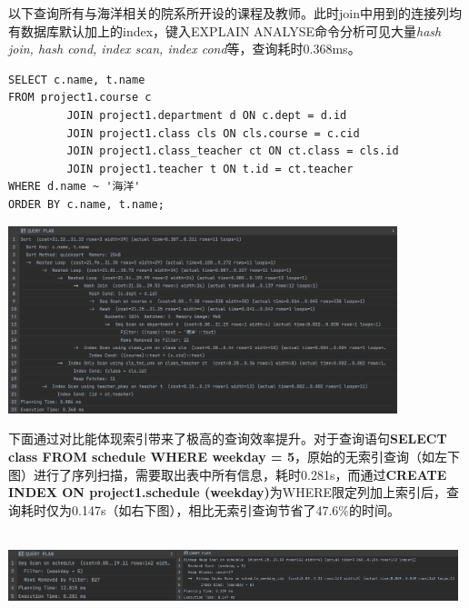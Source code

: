 \par 以下查询所有与海洋相关的院系所开设的课程及教师。此时join中用到的连接列均有数据库默认加上的index，键入EXPLAIN ANALYSE命令分析可见大量\emph{hash join, hash cond, index scan, index cond}等，查询耗时0.368ms。
\begin{lstlisting}
SELECT c.name, t.name
FROM project1.course c
         JOIN project1.department d ON c.dept = d.id
         JOIN project1.class cls ON cls.course = c.cid
         JOIN project1.class_teacher ct ON ct.class = cls.id
         JOIN project1.teacher t ON t.id = ct.teacher
WHERE d.name ~ '海洋'
ORDER BY c.name, t.name;
\end{lstlisting}
\vspace{-2em}
\centerline{\includegraphics[width=0.85\textwidth]{sp/idxp}}

\par 下面通过对比能体现索引带来了极高的查询效率提升。对于查询语句\textbf{SELECT class FROM schedule WHERE weekday = 5}，原始的无索引查询（如左下图）进行了序列扫描，需要取出表中所有信息，耗时0.281s，而通过\textbf{CREATE INDEX ON project1.schedule (weekday)}为WHERE限定列加上索引后，查询耗时仅为0.147s（如右下图），相比无索引查询节省了47.6\%的时间。\\~\\
\centerline{\includegraphics[height=4em]{sp/nid}\qquad\includegraphics[height=4em]{sp/id}}


